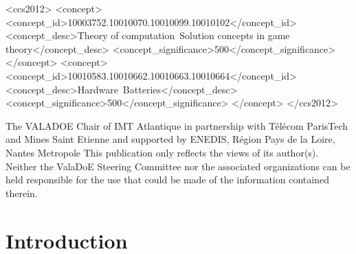 \documentclass[sigconf, table]{acmart}
\begin{document}

\begin{CCSXML}
<ccs2012>
<concept>
<concept_id>10003752.10010070.10010099.10010102</concept_id>
<concept_desc>Theory of computation~Solution concepts in game theory</concept_desc>
<concept_significance>500</concept_significance>
</concept>
<concept>
<concept_id>10010583.10010662.10010663.10010664</concept_id>
<concept_desc>Hardware~Batteries</concept_desc>
<concept_significance>500</concept_significance>
</concept>
</ccs2012>
\end{CCSXML}






\maketitle

\begin{acks}
The VALADOE Chair of IMT Atlantique in partnership with Télécom ParisTech and Mines Saint Etienne and supported by ENEDIS, Région Pays de la Loire, Nantes Metropole
This publication only reflects the views of its author(s). Neither the ValaDoE Steering Committee nor the associated organizations can be held responsible for the use that could be made of the information contained therein.
\end{acks}



\section{Introduction}
\end{document}
